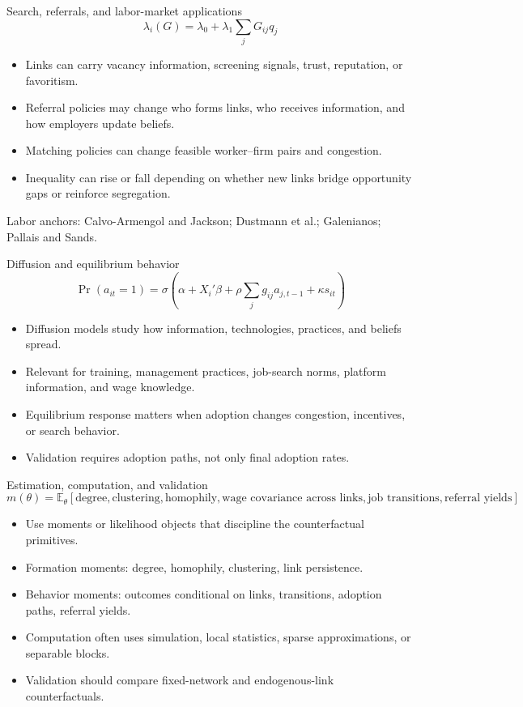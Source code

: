 \documentclass[aspectratio=169,11pt]{beamer}
\newcommand{\E}{\mathbb{E}}
\newcommand{\1}{\mathbf{1}}
\begin{document}
\begin{frame}{Search, referrals, and labor-market applications}
\small
\[
\lambda_i(G)=\lambda_0+\lambda_1\sum_j G_{ij}q_j
\]

\begin{itemize}
    \item Links can carry vacancy information, screening signals, trust, reputation, or favoritism.
    \item Referral policies may change who forms links, who receives information, and how employers update beliefs.
    \item Matching policies can change feasible worker--firm pairs and congestion.
    \item Inequality can rise or fall depending on whether new links bridge opportunity gaps or reinforce segregation.
\end{itemize}

\medskip
Labor anchors: Calvo-Armengol and Jackson; Dustmann et al.; Galenianos; Pallais and Sands.
\end{frame}

\begin{frame}{Diffusion and equilibrium behavior}
\small
\[
\Pr(a_{it}=1)
=
\sigma\left(
\alpha+X_i'\beta+\rho\sum_j g_{ij}a_{j,t-1}+\kappa s_{it}
\right)
\]

\begin{itemize}
    \item Diffusion models study how information, technologies, practices, and beliefs spread.
    \item Relevant for training, management practices, job-search norms, platform information, and wage knowledge.
    \item Equilibrium response matters when adoption changes congestion, incentives, or search behavior.
    \item Validation requires adoption paths, not only final adoption rates.
\end{itemize}
\end{frame}

\begin{frame}{Estimation, computation, and validation}
\small
\[
m(\theta)=\E_\theta[
\text{degree},
\text{clustering},
\text{homophily},
\text{wage covariance across links},
\text{job transitions},
\text{referral yields}]
\]

\begin{itemize}
    \item Use moments or likelihood objects that discipline the counterfactual primitives.
    \item Formation moments: degree, homophily, clustering, link persistence.
    \item Behavior moments: outcomes conditional on links, transitions, adoption paths, referral yields.
    \item Computation often uses simulation, local statistics, sparse approximations, or separable blocks.
    \item Validation should compare fixed-network and endogenous-link counterfactuals.
\end{itemize}
\end{frame}
\end{document}
